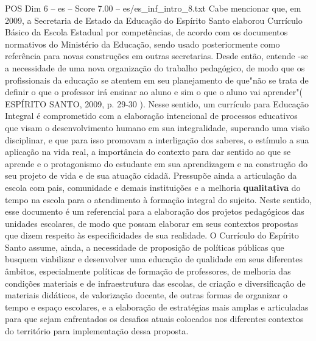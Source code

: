 \begin{textsample}{POS Dim 6 – es – Score 7.00 – es/es\_inf\_intro\_8.txt}
Cabe mencionar que, em 2009, a Secretaria de Estado da Educação do Espírito Santo elaborou Currículo Básico da Escola Estadual por competências, de acordo com os documentos normativos do Ministério da Educação, sendo usado posteriormente como referência para novas construções em outras secretarias.
Desde então, entende -se a necessidade de uma nova organização do trabalho pedagógico, de modo que os profissionais da educação se atentem em seu planejamento de que"não se trata de definir o que o professor irá ensinar ao aluno e sim o que o aluno vai aprender"( ESPÍRITO SANTO, 2009, p. 29-30 ).
Nesse sentido, um currículo para Educação Integral é comprometido com a elaboração intencional de processos educativos que visam o desenvolvimento humano em sua integralidade, superando uma visão disciplinar, e que para isso promovam a interligação dos saberes, o estímulo a sua aplicação na vida real, a importância do contexto para dar sentido ao que se aprende e o protagonismo do estudante em sua aprendizagem e na construção do seu projeto de vida e de sua atuação cidadã.
Pressupõe ainda a articulação da escola com pais, comunidade e demais instituições e a melhoria \textbf{qualitativa} do tempo na escola para o atendimento à formação integral do sujeito.
Neste sentido, esse documento é um referencial para a elaboração dos projetos pedagógicos das unidades escolares, de modo que possam elaborar em seus contextos propostas que dizem respeito às especificidades de sua realidade.
O Currículo do Espírito Santo assume, ainda, a necessidade de proposição de políticas públicas que busquem viabilizar e desenvolver uma educação de qualidade em seus diferentes âmbitos, especialmente políticas de formação de professores, de melhoria das condições materiais e de infraestrutura das escolas, de criação e diversificação de materiais didáticos, de valorização docente, de outras formas de organizar o tempo e espaço escolares, e a elaboração de estratégias mais amplas e articuladas para que sejam enfrentados os desafios atuais colocados nos diferentes contextos do território para implementação dessa proposta.

\end{textsample}
